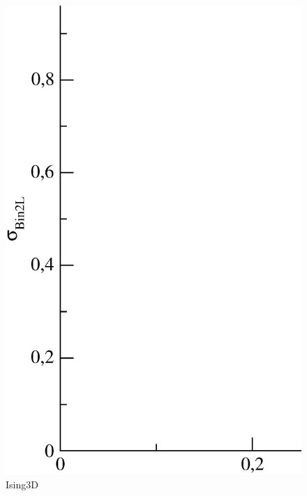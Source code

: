 \begin{figure}[!htpb]
  \centering
  \includegraphics[width=15cm]{./plots/Ising3D/std_intersect_Bin_vs_omega.eps}
  \caption{Ising3D}
\end{figure}

